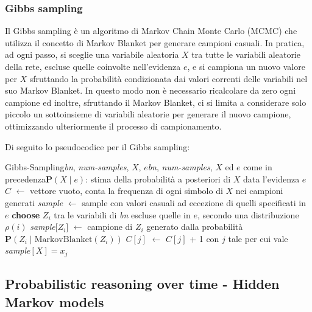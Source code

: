 \subsubsection*{Gibbs sampling}
Il Gibbs sampling è un algoritmo di Markov Chain Monte Carlo (MCMC) che utilizza il concetto di Markov Blanket per generare
campioni casuali. In pratica, ad ogni passo, si sceglie una variabile aleatoria \(X\) tra tutte le variabili aleatorie della
rete, escluse quelle coinvolte nell'evidenza \(e\), e si campiona un nuovo valore per \(X\) sfruttando la probabilità
condizionata dai valori correnti delle variabili nel suo Markov Blanket. In questo modo non è necessario ricalcolare da zero
ogni campione ed inoltre, sfruttando il Markov Blanket, ci si limita a considerare solo piccolo un sottoinsieme di variabili
aleatorie per generare il nuovo campione, ottimizzando ulteriormente il processo di campionamento.

Di seguito lo pseudocodice per il Gibbs sampling:

\begin{algo}{Gibbs-Sampling}{\textit{bn}, \textit{num-samples}, $X$, $e$}{\textit{bn}, \textit{num-samples}, $X$ ed $e$ come in precedenza}{$\textbf{P}(X \mid e)$: stima della probabilità a posteriori di \(X\) data l'evidenza \(e\)}
	\State $C$ $\leftarrow$ vettore vuoto, conta la frequenza di ogni simbolo di $X$ nei campioni generati 
	\State \textit{sample} $\leftarrow$ sample con valori casuali ad eccezione di quelli specificati in $e$
		\State \textbf{choose} $Z_i$ tra le variabili di \textit{bn} escluse quelle in $e$, secondo una distribuzione \(\rho(i)\)
		\State \textit{sample}[$Z_i$] $\leftarrow$ campione di $Z_i$ generato dalla probabilità $\textbf{P}(Z_i \mid \text{MarkovBlanket}(Z_i))$
		\State $C[j]$ $\leftarrow$ $C[j]$ + 1 con $j$ tale per cui vale \textit{sample}$[X] = x_j$
	\EndFor
	\State \Return {} 
\end{algo}

\newpage

\subsection{Probabilistic reasoning over time - Hidden Markov models}
